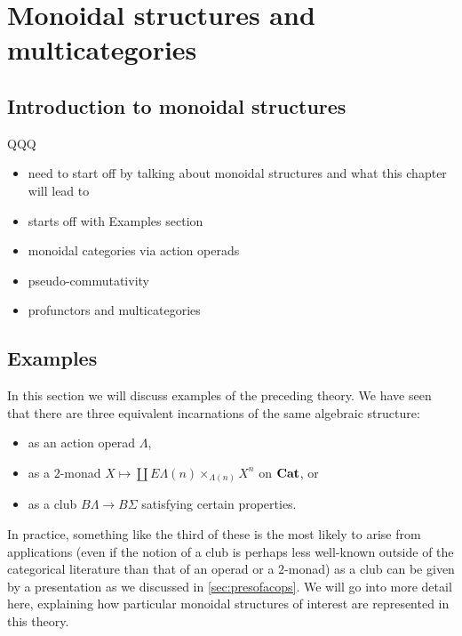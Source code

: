 \section{Monoidal structures and multicategories}
 \subsection{Introduction to monoidal structures}
QQQ
  \begin{itemize}
    \item need to start off by talking about monoidal structures and what this chapter will lead to
    \item starts off with Examples section
    \item monoidal categories via action operads
    \item pseudo-commutativity
    \item profunctors and multicategories
  \end{itemize}
\subsection{Examples}\label{sec:examples}

In this section we will discuss examples of the preceding theory. We have seen that there are three equivalent incarnations of the same algebraic structure:
\begin{itemize}
\item as an action operad $\Lambda$,
\item as a $2$-monad $X \mapsto \coprod E\Lambda(n) \times_{\Lambda(n)} X^{n}$ on $\mathbf{Cat}$, or
\item as a club $B\Lambda \rightarrow B\Sigma$ satisfying certain properties.
\end{itemize}
In practice, something like the third of these is the most likely to arise from applications (even if the notion of a club is perhaps less well-known outside of the categorical literature than that of an operad or a $2$-monad) as a club can be given by a presentation as we discussed in \cref{sec:presofacops}. We will go into more detail here, explaining how particular monoidal structures of interest are represented in this theory.



